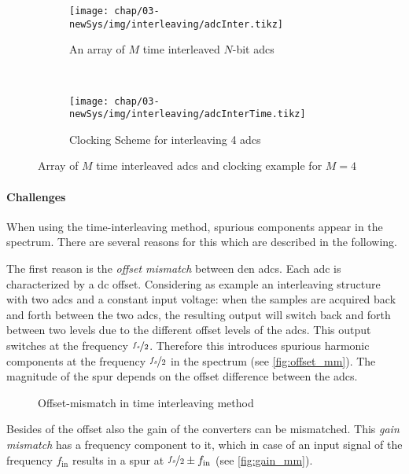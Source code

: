 \begin{figure}[H]
	\centering
	\begin{subfigure}{\textwidth}
		\centering
		\texttt{[image: chap/03-newSys/img/interleaving/adcInter.tikz]}  
		\caption{An array of $M$ time interleaved $N$-bit \glspl{adc} \cite{mangrob}}
		\label{fig:adcInter}
	\end{subfigure}
	\\[4ex]
	\begin{subfigure}{\textwidth}
		\centering
		\tikzexternaldisable
		\texttt{[image: chap/03-newSys/img/interleaving/adcInterTime.tikz]}  
		\caption{Clocking Scheme for interleaving 4 \glspl{adc}}
		\tikzexternalenable
		\label{fig:adcInterTime}
	\end{subfigure}
	\caption[Time-Interleaving Method]{Array of $M$ time interleaved \glspl{adc} and clocking example for $M = 4$}
	\label{fig:interleaving}
\end{figure}

\clearpage
\paragraph{Challenges}
When using the time-interleaving method, spurious components appear in the spectrum. There are several reasons for this which are described in the following.

The first reason is the \textit{offset mismatch} between den \glspl{adc}. 
Each \gls{adc} is characterized by a \gls{dc} offset. 
Considering as example an interleaving structure with two \glspl{adc} and a constant input voltage: when the samples are acquired back and forth between the two \glspl{adc}, the resulting output will switch back and forth between two levels due to the different offset levels of the \glspl{adc}. 
This output switches at the frequency $\nicefrac{f_s}{2}$. 
Therefore this introduces spurious harmonic components at the frequency $\nicefrac{f_s}{2}$ in the spectrum (see \autoref{fig:offset_mm}). 
The magnitude of the spur depends on the offset difference between the \glspl{adc}. \cite{Harris2019}
\begin{figure}[H]
	\centering
	\resizebox{1\textwidth}{!}{}
	\caption{Offset-mismatch in time interleaving method \cite{Harris2019}}
	\label{fig:offset_mm}
\end{figure}

Besides of the offset also the gain of the converters can be mismatched. 
This \textit{gain mismatch} has a frequency component to it, which in case of an input signal of the frequency $f_{\text{in}}$ results in a spur at $\nicefrac{f_s}{2} \pm f_{\text{in}}$ (see \autoref{fig:gain_mm}). \cite{Harris2019}


